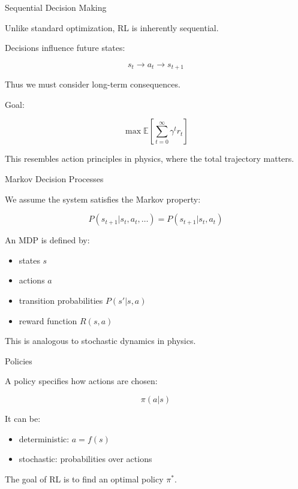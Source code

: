 \documentclass{beamer}
\begin{document}
\begin{frame}{Sequential Decision Making}

Unlike standard optimization, RL is inherently sequential.

Decisions influence future states:

\[
s_t \rightarrow a_t \rightarrow s_{t+1}
\]

Thus we must consider long-term consequences.

Goal:

\[
\max \mathbb{E}\left[\sum_{t=0}^\infty \gamma^t r_t \right]
\]

This resembles action principles in physics,
where the total trajectory matters.

\end{frame}

\begin{frame}{Markov Decision Processes}

We assume the system satisfies the Markov property:

\[
P(s_{t+1}|s_t,a_t,\dots)=P(s_{t+1}|s_t,a_t)
\]

An MDP is defined by:

\begin{itemize}
\item states $s$
\item actions $a$
\item transition probabilities $P(s'|s,a)$
\item reward function $R(s,a)$
\end{itemize}

This is analogous to stochastic dynamics in physics.

\end{frame}

\begin{frame}{Policies}

A policy specifies how actions are chosen:

\[
\pi(a|s)
\]

It can be:

\begin{itemize}
\item deterministic: $a = f(s)$
\item stochastic: probabilities over actions
\end{itemize}

The goal of RL is to find an optimal policy $\pi^*$.

\end{frame}
\end{document}

